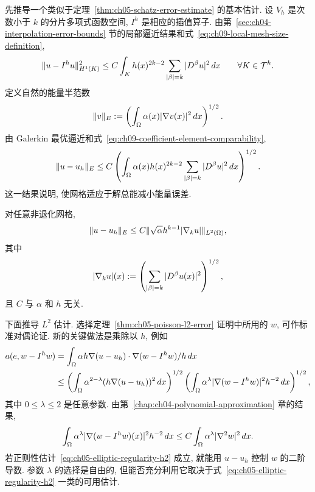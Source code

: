 先推导一个类似于定理~\ref{thm:ch05-schatz-error-estimate} 的基本估计. 设 $V_h$ 是次数小于 $k$ 的分片多项式函数空间, $I^h$ 是相应的插值算子. 由第~\ref{sec:ch04-interpolation-error-bounds} 节的局部逼近结果和式~\eqref{eq:ch09-local-mesh-size-definition},
\[
\MathBookFormulaID{formula-ch09-local-interpolation-estimate}
\|u-I^hu\|_{H^1(K)}^2
\leq C\int_K h(x)^{2k-2}\sum_{|\beta|=k}|D^\beta u|^2\,dx
\qquad\forall K\in\mathcal T^h.
\]
定义自然的能量半范数
\begin{equation}
\MathBookFormulaID{formula-ch09-energy-seminorm}
\label{eq:ch09-energy-seminorm}
\|v\|_E:=\left(\int_\Omega\alpha(x)|\nabla v(x)|^2\,dx\right)^{1/2}.
\end{equation}
由 Galerkin 最优逼近和式~\eqref{eq:ch09-coefficient-element-comparability},
\begin{equation}
\MathBookFormulaID{formula-ch09-adaptive-energy-error}
\label{eq:ch09-adaptive-energy-error}
\|u-u_h\|_E
\leq C\left(\int_\Omega\alpha(x)h(x)^{2k-2}
\sum_{|\beta|=k}|D^\beta u|^2\,dx\right)^{1/2}.
\end{equation}
这一结果说明, 使网格适应于解总能减小能量误差.

\begin{Theorem}
\label{thm:ch09-adaptive-energy-apriori}
对任意非退化网格,
\[
\MathBookFormulaID{formula-ch09-adaptive-energy-apriori}
\|u-u_h\|_E\leq C\|\sqrt\alpha h^{k-1}|\nabla_k u|\|_{L^2(\Omega)},
\]
其中
\[
\MathBookFormulaID{formula-ch09-kth-derivative-magnitude}
|\nabla_k u|(x):=\left(\sum_{|\beta|=k}|D^\beta u(x)|^2\right)^{1/2},
\]
且 $C$ 与 $\alpha$ 和 $h$ 无关.
\end{Theorem}

下面推导 $L^2$ 估计. 选择定理~\ref{thm:ch05-poisson-l2-error} 证明中所用的 $w$, 可作标准对偶论证. 新的关键做法是乘除以 $h$, 例如
\begin{align*}
\MathBookFormulaID{formula-ch09-duality-weight-splitting}
a(e,w-I^hw)
&=\int_\Omega\alpha h\nabla(u-u_h)\cdot\nabla(w-I^hw)/h\,dx\\
&\leq\left(\int_\Omega\alpha^{2-\lambda}(h\nabla(u-u_h))^2\,dx\right)^{1/2}
\left(\int_\Omega\alpha^\lambda|\nabla(w-I^hw)|^2h^{-2}\,dx\right)^{1/2},
\end{align*}
其中 $0\leq\lambda\leq2$ 是任意参数. 由第~\ref{chap:ch04-polynomial-approximation} 章的结果,
\[
\MathBookFormulaID{formula-ch09-weighted-dual-interpolation}
\int_\Omega\alpha^\lambda|\nabla(w-I^hw)(x)|^2h^{-2}\,dx
\leq C\int_\Omega\alpha^\lambda|\nabla^2w|^2\,dx.
\]
若正则性估计~\eqref{eq:ch05-elliptic-regularity-h2} 成立, 就能用 $u-u_h$ 控制 $w$ 的二阶导数. 参数 $\lambda$ 的选择是自由的, 但能否充分利用它取决于式~\eqref{eq:ch05-elliptic-regularity-h2} 一类的可用估计.

